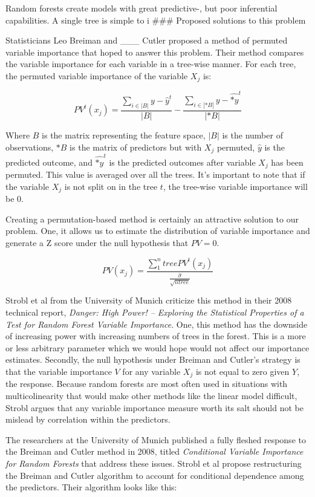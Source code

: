 \documentclass[12pt,twoside]{reedthesis}
\begin{document}
  Random forests create models with great predictive-, but poor
  inferential capabilities. A single tree is simple to i \#\#\# Proposed
  solutions to this problem
  
  Statisticians Leo Breiman and \_\_\_ Cutler proposed a method of
  permuted variable importance that hoped to answer this problem. Their
  method compares the variable importance for each variable in a tree-wise
  manner. For each tree, the permuted variable importance of the variable
  \(X_j\) is:
  
  \[PV^t(x_j) = \frac{\sum_{i \in |B|} {y} - \hat{y}^t}{|B|} - \frac{\sum_{i \in |*B|} {y} - \hat{*y}^t}{|*B|} \]
  
  Where \(B\) is the matrix representing the feature space, \(|B|\) is the
  number of observations, \(*B\) is the matrix of predictors but with
  \(X_j\) permuted, \(\hat{y}\) is the predicted outcome, and
  \(\hat{*y}^t\) is the predicted outcomes after variable \(X_j\) has been
  permuted. This value is averaged over all the trees. It's important to
  note that if the variable \(X_j\) is not split on in the tree \(t\), the
  tree-wise variable importance will be 0.
  
  Creating a permutation-based method is certainly an attractive solution
  to our problem. One, it allows us to estimate the distribution of
  variable importance and generate a Z score under the null hypothesis
  that \(PV = 0\).
  
  \[PV(x_j) = \frac{\sum_1^ntree PV^t(x_j)}{\frac{\hat{\sigma}}{\sqrt{ntree}}}\]
  
  Strobl et al from the University of Munich criticize this method in
  their 2008 technical report, \emph{Danger: High Power! -- Exploring the
  Statistical Properties of a Test for Random Forest Variable Importance}.
  One, this method has the downside of increasing power with increasing
  numbers of trees in the forest. This is a more or less arbitrary
  parameter which we would hope would not affect our importance estimates.
  Secondly, the null hypothesis under Breiman and Cutler's strategy is
  that the variable importance \(V\) for any variable \(X_j\) is not equal
  to zero given \(Y\), the response. Because random forests are most often
  used in situations with multicolinearity that would make other methods
  like the linear model difficult, Strobl argues that any variable
  importance measure worth its salt should not be mislead by correlation
  within the predictors.
  
  The researchers at the University of Munich published a fully fleshed
  response to the Breiman and Cutler method in 2008, titled
  \emph{Conditional Variable Importance for Random Forests} that address
  these issues. Strobl et al propose restructuring the Breiman and Cutler
  algorithm to account for conditional dependence among the predictors.
  Their algorithm looks like this:
  
\end{document}
